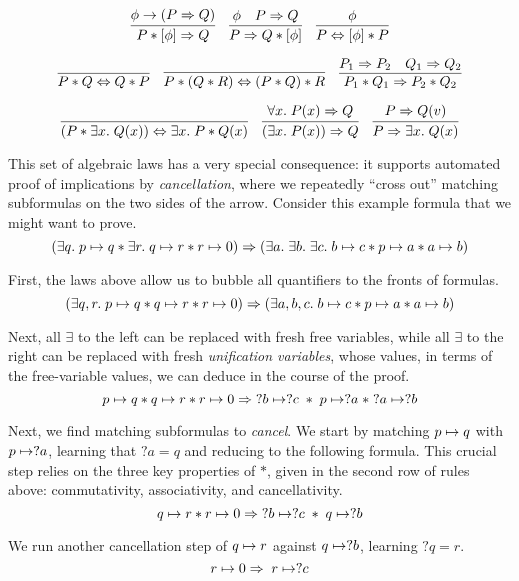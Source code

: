 \documentclass{amsbook}
\theoremstyle{definition}
\theoremstyle{remark}
\numberwithin{section}{chapter}
\numberwithin{equation}{chapter}
\begin{document}
$$\infer{P * \lift{\phi} \Rightarrow Q}{
  \phi \rightarrow (P \Rightarrow Q)
}
\quad \infer{P \Rightarrow Q * \lift{\phi}}{
  \phi
  & P \Rightarrow Q
}
\quad \infer{P \Leftrightarrow \lift{\phi} * P}{
  \phi
}$$

$$\infer{P * Q \Leftrightarrow Q * P}{}
\quad \infer{P * (Q * R) \Leftrightarrow (P * Q) * R}{}
\quad \infer{P_1 * Q_1 \Rightarrow P_2 * Q_2}{
  P_1 \Rightarrow P_2
  & Q_1 \Rightarrow Q_2
}$$

$$\infer{(P * \exists x. \; Q(x)) \Leftrightarrow \exists x. \; P * Q(x)}{}
\quad \infer{(\exists x. \; P(x)) \Rightarrow Q}{
  \forall x. \; P(x) \Rightarrow Q
}
\quad \infer{P \Rightarrow \exists x. \; Q(x)}{
  P \Rightarrow Q(v)
}$$

This set of algebraic laws has a very special consequence: it supports automated proof of implications by \emph{cancellation}, where we repeatedly ``cross out'' matching subformulas on the two sides of the arrow.
Consider this example formula that we might want to prove.
$$(\exists q. \; p \mapsto q * \exists r. \; q \mapsto r * r \mapsto 0) \Rightarrow (\exists a. \; \exists b. \; \exists c. \; b \mapsto c * p \mapsto a * a \mapsto b)$$

First, the laws above allow us to bubble all quantifiers to the fronts of formulas.
$$(\exists q, r. \; p \mapsto q * q \mapsto r * r \mapsto 0) \Rightarrow (\exists a, b, c. \; b \mapsto c * p \mapsto a * a \mapsto b)$$

Next, all $\exists$ to the left can be replaced with fresh free variables, while all $\exists$ to the right can be replaced with fresh \emph{unification variables}, whose values, in terms of the free-variable values, we can deduce in the course of the proof.
$$p \mapsto q * q \mapsto r * r \mapsto 0 \Rightarrow \; ?b \mapsto ?c \; * \; p \mapsto ?a \; * \; ?a \mapsto ?b$$

Next, we find matching subformulas to \emph{cancel}.
We start by matching $p \mapsto q$ with $p \mapsto ?a$, learning that $?a = q$ and reducing to the following formula.
This crucial step relies on the three key properties of $*$, given in the second row of rules above: commutativity, associativity, and cancellativity.
$$q \mapsto r * r \mapsto 0 \Rightarrow \; ?b \mapsto ?c \; * \; q \mapsto ?b$$

We run another cancellation step of $q \mapsto r$ against $q \mapsto ?b$, learning $?q = r$.
$$r \mapsto 0 \Rightarrow \; r \mapsto ?c$$
\end{document}
